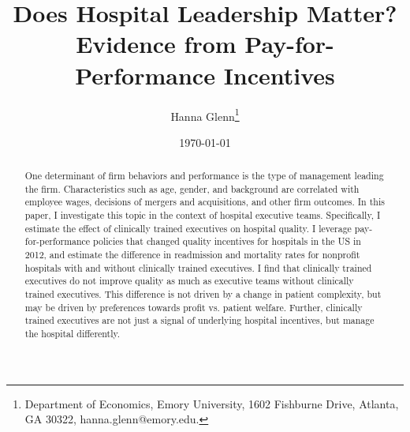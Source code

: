 \documentclass[12pt]{article}
\begin{document}
	
	
	
	
	\linespread{1.2}\title{\vspace{-0.5in} Does Hospital Leadership Matter?\\ \large Evidence from Pay-for-Performance Incentives} 
	
	\date{\today}
	
	\author{\vspace{10mm}Hanna Glenn\footnote{Department of Economics, Emory University, 1602 Fishburne Drive, Atlanta, GA 30322, hanna.glenn@emory.edu.} }
	
	\maketitle
	
	\vspace{-0.2in}
	
	\singlespacing\maketitle


 \vspace{3mm}
	
    \begin{abstract}
		{\small
         One determinant of firm behaviors and performance is the type of management leading the firm. Characteristics such as age, gender, and background are correlated with employee wages, decisions of mergers and acquisitions, and other firm outcomes. In this paper, I investigate this topic in the context of hospital executive teams. Specifically, I estimate the effect of clinically trained executives on hospital quality. I leverage pay-for-performance policies that changed quality incentives for hospitals in the US in 2012, and estimate the difference in readmission and mortality rates for nonprofit hospitals with and without clinically trained executives. I find that clinically trained executives do not improve quality as much as executive teams without clinically trained executives. This difference is not driven by a change in patient complexity, but may be driven by preferences towards profit vs. patient welfare. Further, clinically trained executives are not just a signal of underlying hospital incentives, but manage the hospital differently. 
		} 
	\end{abstract}
	
	
	
	
	\vspace{0.8in}
	
\end{document}
